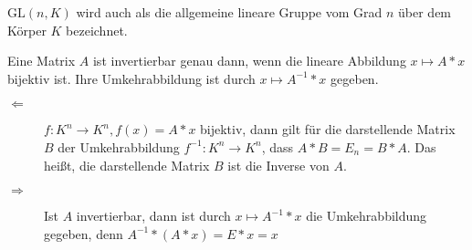 $\mathrm{GL}(n,K)$ wird auch als die allgemeine lineare Gruppe vom Grad $n$ über dem Körper $K$ bezeichnet.

\begin{satz}{}
	Eine Matrix $A$ ist invertierbar genau dann, wenn die lineare Abbildung $x\mapsto A*x$ bijektiv ist. Ihre Umkehrabbildung ist durch $x\mapsto A^{-1}*x$ gegeben.
\end{satz}
\beweis
\begin{description}
	\item[\glqq$\Leftarrow$\grqq]
	$f:K^n\rightarrow K^n, f(x)=A*x$ bijektiv, dann gilt für die darstellende Matrix $B$ der Umkehrabbildung $f^{-1}:K^n\rightarrow K^n$, dass $A*B=E_n=B*A$. Das heißt, die darstellende Matrix $B$ ist die Inverse von $A$.
	\item[\glqq$\Rightarrow$\grqq]
	Ist $A$ invertierbar, dann ist durch $x\mapsto A^{-1}*x$ die Umkehrabbildung gegeben, denn $A^{-1}*(A*x)=E*x=x$
\end{description}
